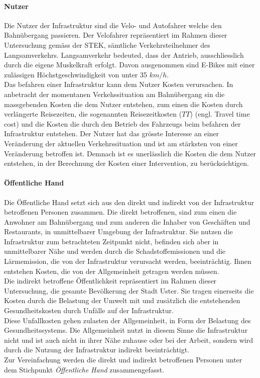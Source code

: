 \paragraph{Nutzer}

Die Nutzer der Infrastruktur sind die Velo- und Autofahrer welche den Bahnübergang passieren. Der Velofahrer repräsentiert im Rahmen dieser Untersuchung gemäss der STEK, sämtliche Verkehrsteilnehmer des Langsamverkehrs. Langsamverkehr bedeuted, dass der Antrieb, ausschliesslich durch die eigene Muskelkraft erfolgt. Davon ausgenommen sind E-Bikes mit einer zulässigen Höchstgeschwindigkeit von unter 35 $km/h$. \\
Das befahren einer Infrastruktur kann dem Nutzer Kosten verursachen. In anbetracht der momentanen Verkehssituation am Bahnübergang sin die massgebenden Kosten die dem Nutzer entstehen, zum einen die Kosten durch verlängerte Reisezeiten, die sogenannten Reisezeitkosten ($TT$) (engl. Travel time cost) und die Kosten die durch den Betrieb des Fahrzeugs beim befahren der Infrastruktur entstehen.  
Der Nutzer hat das grösste Interesse an einer Veränderung der aktuellen Verkehrssituation und ist am stärksten von einer Veränderung betroffen ist. Demnach ist es unerlässlich die Kosten die dem Nutzer entstehen, in der Berechnung der Kosten einer Intervention, zu berücksichtigen.


\paragraph{Öffentliche Hand}

Die Öffentliche Hand setzt sich aus den direkt und indirekt von der Infrastruktur betroffenen Personen zusammen. 
Die direkt betroffenen, sind zum einen die Anwohner am Bahnübergang und zum anderen die Inhaber von Geschäften und Restaurants, in unmittelbarer Umgebung der Infrastruktur. Sie nutzen die Infrastruktur zum betrachteten Zeitpunkt nicht, befinden sich aber in unmittelbarer Nähe und werden durch die Schadstoffemissionen und die Lärmemission, die von der Infrastruktur verursacht werden, beeinträchtig. 
Ihnen entstehen Kosten, die von der Allgemeinheit getragen werden müssen.\\
Die indirekt betroffene Öffentlichkeit repräsentiert im Rahmen dieser Untersuchung, die gesamte Bevölkerung der Stadt Uster. 
Sie tragen einerseits die Kosten durch die Belastung der Umwelt mit und zusätzlich die entstehenden Gesundheitskosten durch Unfälle auf der Infrastruktur. \\
Diese Unfallkosten gehen zulasten der Allgemeinheit, in Form der Belastung des Gesundheitssystems. Die Allgemeinheit nutzt in diesem Sinne die Infrastruktur nicht und ist auch nicht in ihrer Nähe zuhause oder bei der Arbeit, sondern wird durch die Nutzung der Infrastruktur indirekt beeinträchtigt. \\
Zur Vereinfachung werden die direkt und indirekt betroffenen Personen unter dem Stichpunkt \textit{Öffentliche Hand} zusammengefasst.
 


%

